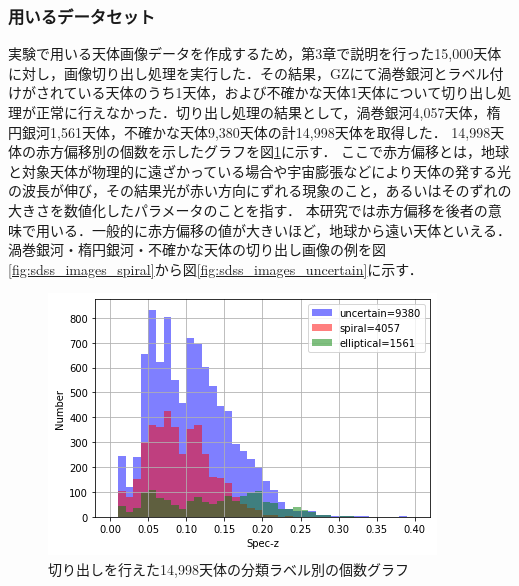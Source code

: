 \documentclass[a4j, 11pt]{jreport}
\begin{document}
\subsubsection{用いるデータセット}
実験で用いる天体画像データを作成するため，第3章で説明を行った15,000天体に対し，画像切り出し処理を実行した．その結果，GZにて渦巻銀河とラベル付けがされている天体のうち1天体，および不確かな天体1天体について切り出し処理が正常に行えなかった．切り出し処理の結果として，渦巻銀河4,057天体，楕円銀河1,561天体，不確かな天体9,380天体の計14,998天体を取得した．
14,998天体の赤方偏移別の個数を示したグラフを図\ref{fig:z_15000}に示す．
ここで赤方偏移とは，地球と対象天体が物理的に遠ざかっている場合や宇宙膨張などにより天体の発する光の波長が伸び，その結果光が赤い方向にずれる現象のこと，あるいはそのずれの大きさを数値化したパラメータのことを指す．
本研究では赤方偏移を後者の意味で用いる．一般的に赤方偏移の値が大きいほど，地球から遠い天体といえる．
渦巻銀河・楕円銀河・不確かな天体の切り出し画像の例を図\ref{fig:sdss_images_spiral}から図\ref{fig:sdss_images_uncertain}に示す．

\begin{figure}[H]
 \centering
 \includegraphics[width=1\hsize]{images/z_15000_0_040_kesson.png}
 \caption{切り出しを行えた14,998天体の分類ラベル別の個数グラフ}
 \label{fig:z_15000}
\end{figure}
\end{document}
